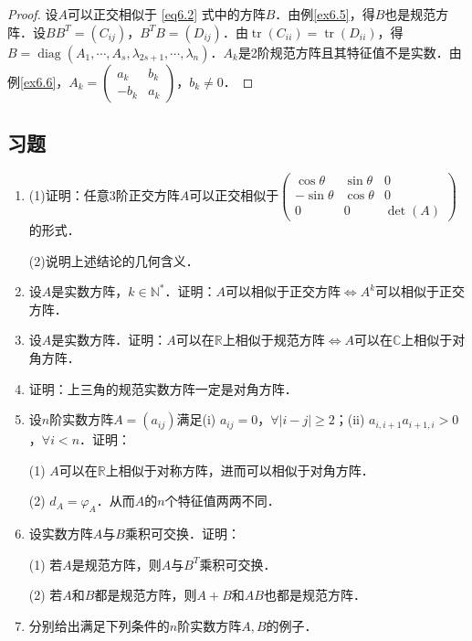 \documentclass[a4paper,fontset=windows]{ctexbook}
\theoremstyle{definition}
\DeclareMathOperator{\diag}{diag}
\DeclareMathOperator{\tr}{tr}
\renewcommand{\ge}{\geqslant}
\begin{document}
\begin{proof}
设$A$可以正交相似于 \eqref{eq6.2} 式中的方阵$B$．由例\ref{ex6.5}，得$B$也是规范方阵．设$BB^T=(C_{ij})$，$B^TB=(D_{ij})$．由$\tr(C_{ii})=\tr(D_{ii})$，得$B=\diag(A_1,\cdots,A_s,\lambda_{2s+1},\cdots,\lambda_n)$．$A_k$是2阶规范方阵且其特征值不是实数．由例\ref{ex6.6}，$A_k=\begin{pmatrix}a_k&b_k \\ -b_k&a_k\end{pmatrix}$，$b_k\ne 0$．
\end{proof}

\subsection*{习题}

\begin{enumerate}
\item (1)证明：任意3阶正交方阵$A$可以正交相似于$\begin{pmatrix}\cos\theta&\sin\theta&0 \\ -\sin\theta&\cos\theta&0 \\ 0&0&\det(A)\end{pmatrix}$的形式．

(2)说明上述结论的几何含义．

\item 设$A$是实数方阵，$k\in\mathbb{N}^*$．证明：$A$可以相似于正交方阵$\Leftrightarrow A^k$可以相似于正交方阵．

\item 设$A$是实数方阵．证明：$A$可以在$\mathbb{R}$上相似于规范方阵$\Leftrightarrow A$可以在$\mathbb{C}$上相似于对角方阵．

\item 证明：上三角的规范实数方阵一定是对角方阵．

\item 设$n$阶实数方阵$A=(a_{ij})$满足(i) $a_{ij}=0$，$\forall|i-j|\ge 2$；(ii) $a_{i,i+1}a_{i+1,i}>0$，$\forall i<n$．证明：

(1) $A$可以在$\mathbb{R}$上相似于对称方阵，进而可以相似于对角方阵．

(2) $d_A=\varphi_A$．从而$A$的$n$个特征值两两不同．

\item 设实数方阵$A$与$B$乘积可交换．证明：

(1) 若$A$是规范方阵，则$A$与$B^T$乘积可交换．

(2) 若$A$和$B$都是规范方阵，则$A+B$和$AB$也都是规范方阵．

\item 分别给出满足下列条件的$n$阶实数方阵$A,B$的例子．


\end{enumerate}
\end{document}
